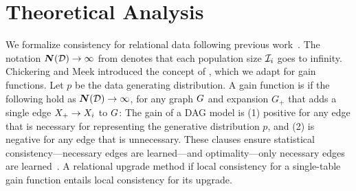 \documentclass{article}
\begin{document}
\section{Theoretical Analysis}
We formalize consistency for relational data following previous work~\cite{Sakai2013,Xiang2011}. The notation $\boldsymbol{N}(\mathcal{D}) \rightarrow \infty$ from 
denotes that  each population size $\mathcal{I}_{i}$ goes to infinity. Chickering and Meek \citeyear{Chickering2002}
introduced the concept of  , which we adapt for  
gain functions. Let $p$ be the data generating distribution. A gain function is  if the following hold 
as $\boldsymbol{N}(\mathcal{D}) \rightarrow \infty$, for any graph $G$ and expansion $G_{+}$ that adds a single edge $X_{+} \rightarrow X_{i}$ to $G$: The gain of a DAG model is (1) positive for any edge that is necessary for representing the generative distribution $p$, and (2) is negative for any edge that is unnecessary. These clauses ensure statistical consistency---necessary edges are learned---and optimality---only necessary edges are learned~. A relational upgrade method  if local consistency for a single-table gain function entails local consistency for its upgrade.

%
%

\end{document}
